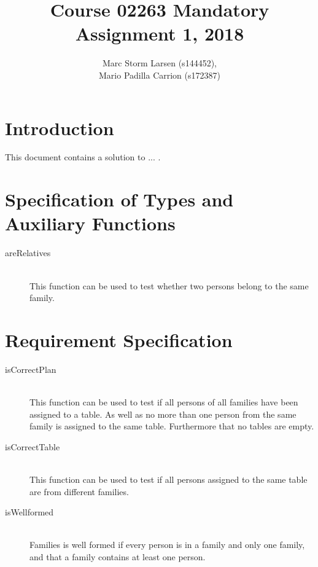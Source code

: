 \documentclass[a4]{article}
\title{Course 02263 Mandatory Assignment 1, 2018}
\author{Marc Storm Larsen (s144452),\\ 
        Mario Padilla Carrion (s172387)}
\begin{document}
\maketitle

\tableofcontents
\newpage

\section{Introduction}
This document contains a solution to ... . 

\section{Specification of Types and Auxiliary Functions}


  

\begin{description}
  \item[areRelatives] \hfill \\ This function can be used to test whether two persons belong to the same family.
\end{description}

\section{Requirement Specification}

  

\begin{description}
  \item[isCorrectPlan] \hfill \\ This function can be used to test if all persons of all families have been assigned to a table. As well as no more than one person from the same family is assigned to the same table. Furthermore that no tables are empty.
  \item[isCorrectTable] \hfill \\ This function can be used to test if all persons assigned to the same table are from different families.
  \item[isWellformed] \hfill \\ Families is well formed if every person is in a family and only one family, and that a family contains at least one person.
\end{description}
\end{document}
